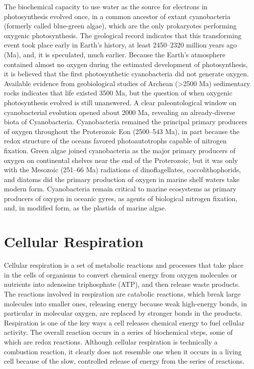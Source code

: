 The biochemical capacity to use water as the source for electrons in photosynthesis evolved once, in a common ancestor of extant cyanobacteria (formerly called blue-green algae), which are the only prokaryotes performing oxygenic photosynthesis. The geological record indicates that this transforming event took place early in Earth's history, at least 2450--2320 million years ago (Ma), and, it is speculated, much earlier. Because the Earth's atmosphere contained almost no oxygen during the estimated development of photosynthesis, it is believed that the first photosynthetic cyanobacteria did not generate oxygen. Available evidence from geobiological studies of Archean (\textgreater2500 Ma) sedimentary rocks indicates that life existed 3500 Ma, but the question of when oxygenic photosynthesis evolved is still unanswered. A clear paleontological window on cyanobacterial evolution opened about 2000 Ma, revealing an already-diverse biota of Cyanobacteria. Cyanobacteria remained the principal primary producers of oxygen throughout the Proterozoic Eon (2500--543 Ma), in part because the redox structure of the oceans favored photoautotrophs capable of nitrogen fixation. Green algae joined cyanobacteria as the major primary producers of oxygen on continental shelves near the end of the Proterozoic, but it was only with the Mesozoic (251--66 Ma) radiations of dinoflagellates, coccolithophorids, and diatoms did the primary production of oxygen in marine shelf waters take modern form. Cyanobacteria remain critical to marine ecosystems as primary producers of oxygen in oceanic gyres, as agents of biological nitrogen fixation, and, in modified form, as the plastids of marine algae.

\hypertarget{cellular-respiration}{%
\section{Cellular Respiration}\label{cellular-respiration}}

Cellular respiration is a set of metabolic reactions and processes that take place in the cells of organisms to convert chemical energy from oxygen molecules or nutrients into adenosine triphosphate (ATP), and then release waste products. The reactions involved in respiration are catabolic reactions, which break large molecules into smaller ones, releasing energy because weak high-energy bonds, in particular in molecular oxygen, are replaced by stronger bonds in the products. Respiration is one of the key ways a cell releases chemical energy to fuel cellular activity. The overall reaction occurs in a series of biochemical steps, some of which are redox reactions. Although cellular respiration is technically a combustion reaction, it clearly does not resemble one when it occurs in a living cell because of the slow, controlled release of energy from the series of reactions.



